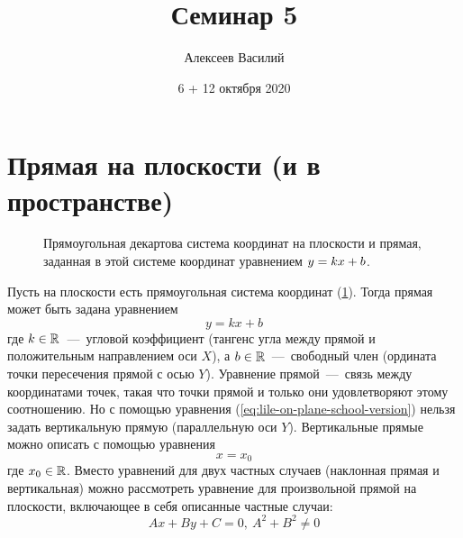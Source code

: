 \documentclass[a4paper,12pt]{article}
\author{Алексеев Василий}
\title{Семинар 5}
\date{6 + 12 октября 2020}
\begin{document}
  \maketitle
  
  \tableofcontents

  \thispagestyle{empty}
  
  \newpage
  


  \section{Прямая на плоскости (и в пространстве)}
  
  \begin{figure}[h]
    \centering
    
    
    \caption{Прямоугольная декартова система координат на плоскости и прямая, заданная в этой системе координат уравнением $y \hm= kx \hm+ b$.}
    \label{fig:line-on-plane}
  \end{figure}
  
  Пусть на плоскости есть прямоугольная система координат (\ref{fig:line-on-plane}).
  Тогда прямая может быть задана уравнением
  \begin{equation}\label{eq:lile-on-plane-school-version}
    y = kx + b
  \end{equation}
  где $k \hm\in \RR$~---~угловой коэффициент (тангенс угла между прямой и положительным направлением оси $X$),
  а $b \hm\in \RR$~---~свободный член (ордината точки пересечения прямой с осью $Y$).
  Уравнение прямой~---~связь между координатами точек, такая что точки прямой и только они удовлетворяют этому соотношению.
  Но с помощью уравнения (\ref{eq:lile-on-plane-school-version})
  нельзя задать вертикальную прямую (параллельную оси $Y$).
  Вертикальные прямые можно описать с помощью уравнения
  \[
    x = x_0
  \]
  где $x_0 \hm\in \RR$.
  Вместо уравнений для двух частных случаев (наклонная прямая и вертикальная) можно рассмотреть уравнение для произвольной прямой на плоскости, включающее в себя описанные частные случаи:
  \begin{equation}\label{eq:line-in-coord-system}
    Ax + By + C = 0,\ A^2 + B^2 \not= 0
  \end{equation}
  
\end{document}
